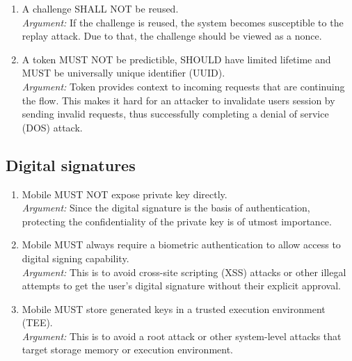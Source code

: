 \begin{enumerate}
            \item A challenge SHALL NOT be reused.\\
            \textit{Argument:} If the challenge is reused, the system becomes susceptible to the replay attack. 
                               Due to that, the challenge should be viewed as a nonce.

            \item A token MUST NOT be predictible, SHOULD have limited lifetime and MUST be universally unique
                  identifier (UUID).\\
            \textit{Argument:} Token provides context to incoming requests that are continuing the flow. This makes 
                               it hard for an attacker to invalidate users session by sending invalid requests, thus 
                               successfully completing a denial of service (DOS) attack.
        \end{enumerate}

    \subsection{Digital signatures}
        \begin{enumerate}[resume]
            \item Mobile MUST NOT expose private key directly.\\
            \textit{Argument:} Since the digital signature is the basis of authentication, protecting the 
                               confidentiality of the private key is of utmost importance.                               

            \item Mobile MUST always require a biometric authentication to allow access to digital signing 
                  capability.\\        
            \textit{Argument:} This is to avoid cross-site scripting (XSS) attacks or other illegal attempts to 
                               get the user's digital signature without their explicit approval.

            \item Mobile MUST store generated keys in a trusted execution environment (TEE).\\        
            \textit{Argument:} This is to avoid a root attack or other system-level attacks that target storage 
                               memory or execution environment.
        \end{enumerate}

